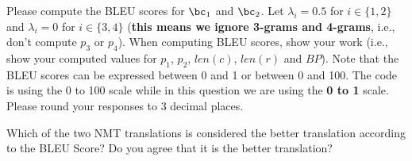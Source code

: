 \begin{parts}
\begin{subparts}
        Please compute the BLEU scores for $\bc_1$ and $\bc_2$. Let $\lambda_i=0.5$ for $i\in\{1,2\}$ and $\lambda_i=0$ for $i\in\{3,4\}$ (\textbf{this means we ignore 3-grams and 4-grams}, i.e., don't compute $p_3$ or $p_4$). When computing BLEU scores, show your work (i.e., show your computed values for $p_1$, $p_2$, $len(c)$, $len(r)$ and $BP$). Note that the BLEU scores can be expressed between 0 and 1 or between 0 and 100. The code is using the 0 to 100 scale while in this question we are using the \textbf{0 to 1} scale. Please round your responses to 3 decimal places. 
        \newline
        
        Which of the two NMT translations is considered the better translation according to the BLEU Score? Do you agree that it is the better translation?
        

\end{subparts}
\end{parts}
